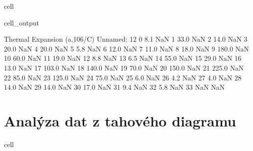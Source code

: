 \documentclass[letterpaper,10pt,english]{jupyterBook}
\begin{document}
{{\begin{sphinxuseclass}{cell}
\begin{sphinxVerbatimOutput}
\begin{sphinxuseclass}{cell_output}
\begin{sphinxVerbatim}[commandchars=\\\{\}]
    Thermal Expansion (a,10\PYGZhy{}6/C)  Unnamed: 12  
0                            8.1          NaN  
1                           33.0          NaN  
2                           14.0          NaN  
3                           20.0          NaN  
4                           20.0          NaN  
5                            5.8          NaN  
6                           12.0          NaN  
7                           11.0          NaN  
8                           18.0          NaN  
9                          180.0          NaN  
10                          60.0          NaN  
11                          19.0          NaN  
12                           8.8          NaN  
13                           6.5          NaN  
14                          55.0          NaN  
15                          29.0          NaN  
16                          13.0          NaN  
17                         103.0          NaN  
18                         140.0          NaN  
19                          70.0          NaN  
20                         150.0          NaN  
21                         225.0          NaN  
22                          85.0          NaN  
23                         125.0          NaN  
24                          75.0          NaN  
25                           6.0          NaN  
26                           4.2          NaN  
27                           4.0          NaN  
28                          14.0          NaN  
29                          14.0          NaN  
30                          17.0          NaN  
31                           9.4          NaN  
32                           5.8          NaN  
33                           NaN          NaN  
\end{sphinxVerbatim}

\end{sphinxuseclass}\end{sphinxVerbatimOutput}

\end{sphinxuseclass}
\sphinxstepscope


\section{Analýza dat z tahového diagramu}
\label{\detokenize{Prednasky/2_7_P_u0159_xedklad _tahov_xe9_zkou_u0161ky:analyza-dat-z-tahoveho-diagramu}}\label{\detokenize{Prednasky/2_7_P_u0159_xedklad _tahov_xe9_zkou_u0161ky::doc}}
\begin{sphinxuseclass}{cell}\begin{sphinxVerbatimInput}


\end{sphinxVerbatimInput}
\end{sphinxuseclass}}}
\end{document}
